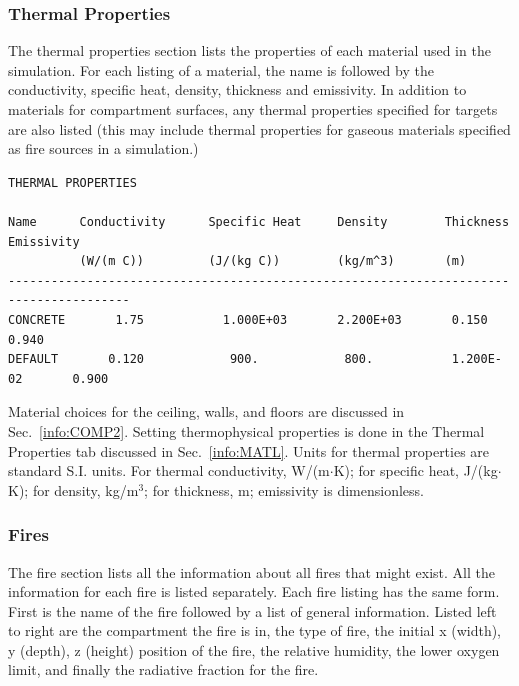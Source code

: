 \subsubsection{Thermal Properties}

The thermal properties section lists the properties of each material used in the simulation. For each listing of a material, the name is followed by the conductivity, specific heat, density, thickness and emissivity. In addition to materials for compartment surfaces, any thermal properties specified for targets are also listed (this may include thermal properties for gaseous materials specified as fire sources in a simulation.)
\begin{lstlisting}[basicstyle=\tiny]
THERMAL PROPERTIES

Name      Conductivity      Specific Heat     Density        Thickness     Emissivity
          (W/(m C))         (J/(kg C))        (kg/m^3)       (m)
---------------------------------------------------------------------------------------
CONCRETE       1.75           1.000E+03       2.200E+03       0.150           0.940
DEFAULT       0.120            900.            800.           1.200E-02       0.900
\end{lstlisting}
Material choices for the ceiling, walls, and floors are discussed in Sec.~\ref{info:COMP2}. Setting thermophysical properties is done in the Thermal Properties tab discussed in Sec.~\ref{info:MATL}. Units for thermal properties are standard S.I. units.  For thermal conductivity,  W/(m$\cdot$K); for specific heat,  J/(kg$\cdot$K); for density, kg/m$^3$; for thickness, m; emissivity is dimensionless.


\subsubsection{Fires}

The fire section lists all the information about all fires that might exist.  All the information for each fire is listed separately.   Each fire listing has the same form.  First is the name of the fire followed by a list of general information.  Listed left to right are the compartment the fire is in, the type of fire, the initial x (width), y (depth), z (height) position of the fire, the relative humidity, the lower oxygen limit, and finally the radiative fraction for the fire.

